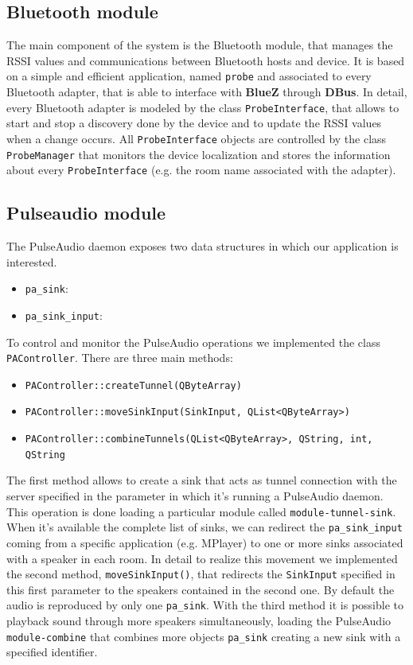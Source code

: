 \documentclass[conference]{IEEEtran}
\begin{document}
\subsection{Bluetooth module}
The main component of the system is the Bluetooth module, that manages the RSSI values and communications between Bluetooth hosts and device. It is based on a simple and efficient application, named \texttt{probe} and associated to every Bluetooth adapter, that is able to interface with \textbf{BlueZ} through \textbf{DBus}. In detail, every Bluetooth adapter is modeled by the class \texttt{ProbeInterface}, that allows to start and stop a discovery done by the device and to update the RSSI values when a change occurs. All \texttt{ProbeInterface} objects are controlled by the class \texttt{ProbeManager} that monitors the device localization and stores the information about every \texttt{ProbeInterface} (e.g. the room name associated with the adapter).

\subsection{Pulseaudio module}
The PulseAudio daemon exposes two data structures in which our application is interested.
\begin{itemize}
\item \texttt{pa\_sink}:
\item \texttt{pa\_sink\_input}:
\end{itemize}

To control and monitor the PulseAudio operations we implemented the class \texttt{PAController}. There are three main methods:
\begin{itemize}
\item \texttt{PAController::createTunnel(QByteArray)}
\item \texttt{PAController::moveSinkInput(SinkInput, QList<QByteArray>)}
\item \texttt{PAController::combineTunnels(QList<QByteArray>, QString, int, QString}
\end{itemize}
The first method allows to create a sink that acts as tunnel connection with the server specified in the parameter in which it's running a PulseAudio daemon. This operation is done loading a particular module called \texttt{module-tunnel-sink}. When it's available the complete list of sinks, we can redirect the \texttt{pa\_sink\_input} coming from a specific application (e.g. MPlayer) to one or more sinks associated with a speaker in each room. In detail to realize this movement we implemented the second method, \texttt{moveSinkInput()}, that redirects the \texttt{SinkInput} specified in this first parameter to the speakers contained in the second one.
By default the audio is reproduced by only one \texttt{pa\_sink}. With the third method it is possible to playback sound through more speakers simultaneously, loading the PulseAudio \texttt{module-combine} that combines more objects \texttt{pa\_sink} creating a new sink with a specified identifier.
\end{document}
